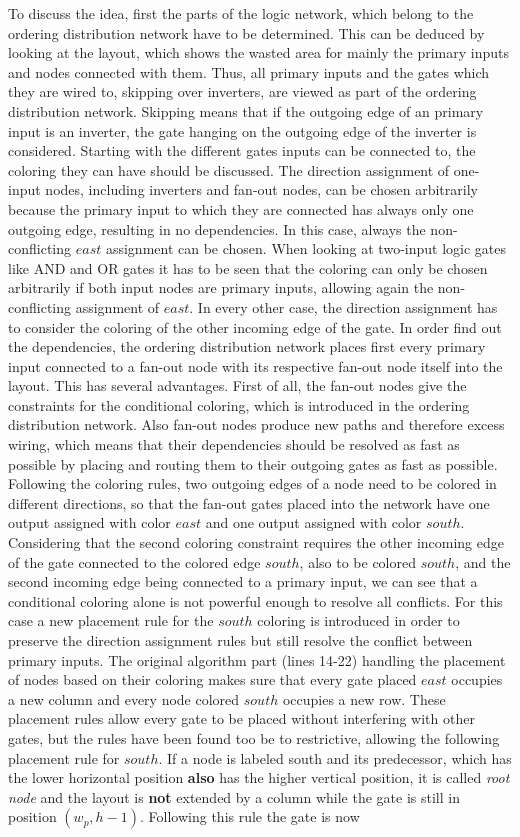 To discuss the idea, first the parts of the logic network, which belong to the ordering distribution network have to be determined. This can be deduced by looking at the layout, which shows the wasted area for mainly the primary inputs and nodes connected with them. Thus, all primary inputs and the gates which they are wired to, skipping over inverters, are viewed as part of the ordering distribution network. Skipping means that if the outgoing edge of an primary input is an inverter, the gate hanging on the outgoing edge of the inverter is considered. Starting with the different gates inputs can be connected to, the coloring they can have should be discussed. The direction assignment of one-input nodes, including inverters and fan-out nodes, can be chosen arbitrarily because the primary input to which they are connected has always only one outgoing edge, resulting in no dependencies. In this case, always the non-conflicting $east$ assignment can be chosen. When looking at two-input logic gates like AND and OR gates it has to be seen that the coloring can only be chosen arbitrarily if both input nodes are primary inputs, allowing again the non-conflicting assignment of $east$. In every other case, the direction assignment has to consider the coloring of the other incoming edge of the gate. In order find out the dependencies, the ordering distribution network places first every primary input connected to a fan-out node with its respective fan-out node itself into the layout. This has several advantages. First of all, the fan-out nodes give the constraints for the conditional coloring, which is introduced in the ordering distribution network. Also fan-out nodes produce new paths and therefore excess wiring, which means that their dependencies should be resolved as fast as possible by placing and routing them to their outgoing gates as fast as possible. Following the coloring rules, two outgoing edges of a node need to be colored in different directions, so that the fan-out gates placed into the network have one output assigned with color $east$ and one output assigned with color $south$. Considering that the second coloring constraint requires the other incoming edge of the gate connected to the colored edge $south$, also to be colored $south$, and the second incoming edge being connected to a primary input, we can see that a conditional coloring alone is not powerful enough to resolve all conflicts. For this case a new placement rule for the $south$ coloring is introduced in order to preserve the direction assignment rules but still resolve the conflict between primary inputs. The original algorithm part (lines 14-22) handling the placement of nodes based on their coloring makes sure that every gate placed $east$ occupies a new column and every node colored $south$ occupies a new row. These placement rules allow every gate to be placed without interfering with other gates, but the rules have been found too be to restrictive, allowing the following placement rule for $south$. If a node is labeled south and its predecessor, which has the lower horizontal position \textbf{also} has the higher vertical position, it is called \textit{root node} and the layout is \textbf{not} extended by a column while the gate is still in position $(w_p, h-1)$. Following this rule the gate is now 